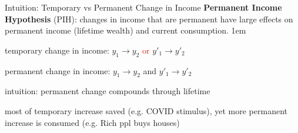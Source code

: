 \documentclass[11pt,aspectratio=43]{beamer}
\newcommand{\red}[1]{\textcolor{red}{#1}}
\let\olditemize=\itemize
\let\endolditemize=\enditemize
\renewenvironment{itemize}{\olditemize \itemsep1em}{\endolditemize}
\theoremstyle{definition}
\begin{document}
\begin{frame}{Intuition: Temporary vs Permanent Change in Income}
\label{slide:Intuition__Temporary_vs_Permanent_Change_in_Income}
    \textbf{Permanent Income Hypothesis} (PIH): changes in income that are permanent have large effects on
permanent income (lifetime wealth) and current consumption.
    \begin{itemize}
        \item temporary change in income: $ y_{1} \rightarrow y_{2}  $ \red{or} $ y'_{1} \rightarrow y'_{2} $
        \item permanent change in income: $ y_{1} \rightarrow y_{2}  $ \alert{and} $ y'_{1} \rightarrow y'_{2} $
        \item intuition: permanent change compounds through lifetime
        \item most of temporary increase saved (e.g. COVID stimulus), yet more permanent increase is consumed (e.g. Rich ppl buys houses)
    \end{itemize}
\end{frame}
\end{document}

